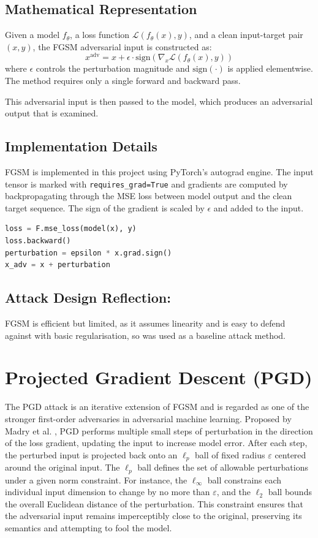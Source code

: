 \subsection*{Mathematical Representation}
Given a model $f_\theta$, a loss function $\mathcal{L}(f_\theta(x), y)$, and a clean input-target pair $(x, y)$, the FGSM adversarial input is constructed as:
\[
x^{\text{adv}} = x + \epsilon \cdot \text{sign} \left( \nabla_x \mathcal{L}(f_\theta(x), y) \right)
\]
where $\epsilon$ controls the perturbation magnitude and $\text{sign}(\cdot)$ is applied elementwise. The method requires only a single forward and backward pass.

This adversarial input is then passed to the model, which produces an adversarial output that is examined.

\subsection*{Implementation Details}
FGSM is implemented in this project using PyTorch's autograd engine. The input tensor is marked with \texttt{requires\_grad=True} and gradients are computed by backpropagating through the MSE loss between model output and the clean target sequence. The sign of the gradient is scaled by $\epsilon$ and added to the input.

\begin{lstlisting}[language=Python, caption={FGSM adversarial attack implementation}]
loss = F.mse_loss(model(x), y)
loss.backward()
perturbation = epsilon * x.grad.sign()
x_adv = x + perturbation
\end{lstlisting}

\subsection*{Attack Design Reflection:}  
FGSM is efficient but limited, as it assumes linearity and is easy to defend against with basic regularisation, so was used as a baseline attack method.

\section{Projected Gradient Descent (PGD)}

The PGD attack is an iterative extension of FGSM and is regarded as one of the stronger first-order adversaries in adversarial machine learning. Proposed by Madry et al. \cite{madry2018towards}, PGD performs multiple small steps of perturbation in the direction of the loss gradient, updating the input to increase model error. After each step, the perturbed input is projected back onto an $\ell_p$ ball of fixed radius $\varepsilon$ centered around the original input. The $\ell_p$ ball defines the set of allowable perturbations under a given norm constraint. For instance, the $\ell_\infty$ ball constrains each individual input dimension to change by no more than $\varepsilon$, and the $\ell_2$ ball bounds the overall Euclidean distance of the perturbation. This constraint ensures that the adversarial input remains imperceptibly close to the original, preserving its semantics and attempting to fool the model.

